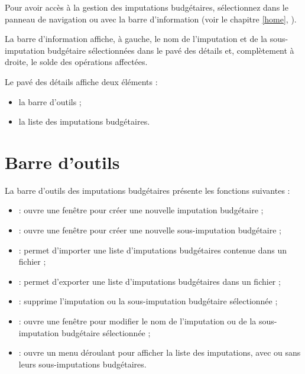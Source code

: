 Pour avoir accès à la gestion des imputations budgétaires, sélectionnez  dans le panneau de navigation ou avec la barre d'information (voir le chapitre \vref{home}, ).

La barre d'information affiche, à gauche, le nom de l'imputation et de la sous-imputation budgétaire sélectionnées dans le pavé des détails et, complètement à droite, le solde des opérations affectées.

Le pavé des détails affiche deux éléments :
\begin{itemize}
	 \item la barre d'outils ;
	 \item la liste des imputations budgétaires.
\end{itemize}


\section{Barre d'outils\label{budgetarylines-functions}}


La barre d'outils des imputations budgétaires présente les fonctions suivantes :

\begin{itemize}
	 \item {} : ouvre une fenêtre pour créer une nouvelle imputation budgétaire ;
	 \item {} : ouvre une fenêtre pour créer une nouvelle sous-imputation budgétaire ;
	 \item {} : permet d'importer une liste d'imputations budgétaires contenue dans un fichier ;
	 \item {} : permet d'exporter une liste d'imputations budgétaires dans un fichier ;
	 \item {} : supprime l'imputation ou la sous-imputation budgétaire sélectionnée ;
	 \item {} : ouvre une fenêtre pour modifier le nom de l'imputation ou de la sous-imputation budgétaire sélectionnée ;
	 \item {} : ouvre un menu déroulant pour afficher la liste des 	imputations, avec ou sans leurs sous-imputations budgétaires.
\end{itemize}



